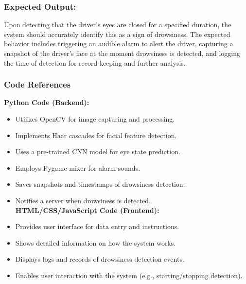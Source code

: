 \documentclass[12pt]{article}
\begin{document}
\subsubsection{Expected Output: }
Upon detecting that the driver’s eyes are closed for a specified duration, the system should accurately identify this as a sign of drowsiness. The expected behavior includes triggering an audible alarm to alert the driver, capturing a snapshot of the driver's face at the moment drowsiness is detected, and logging the time of detection for record-keeping and further analysis.

\subsubsection{Code References}
\textbf{Python Code (Backend):}

\begin{itemize}
\item Utilizes OpenCV for image capturing and processing.
\item Implements Haar cascades for facial feature detection.
\item Uses a pre-trained CNN model for eye state prediction.
\item Employs Pygame mixer for alarm sounds.
\item Saves snapshots and timestamps of drowsiness detection.
\item Notifies a server when drowsiness is detected.\\
\textbf{HTML/CSS/JavaScript Code (Frontend):}

\item Provides user interface for data entry and instructions.
\item Shows detailed information on how the system works.
\item Displays logs and records of drowsiness detection events.
\item Enables user interaction with the system (e.g., starting/stopping detection).
\end{itemize} 
\end{document}
